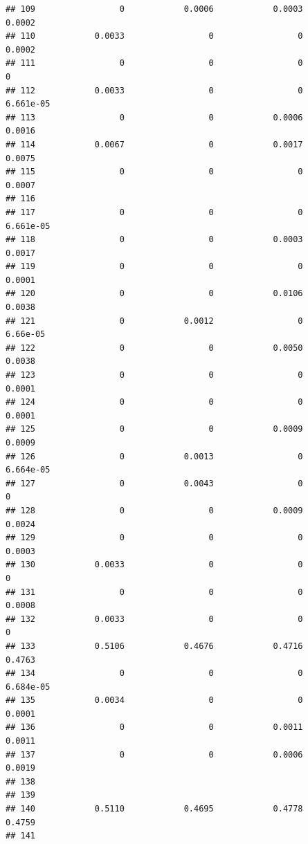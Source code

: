 \documentclass[
]{article}
\begin{document}
\begin{verbatim}
## 109                 0            0.0006            0.0003            0.0002
## 110            0.0033                 0                 0            0.0002
## 111                 0                 0                 0                 0
## 112            0.0033                 0                 0         6.661e-05
## 113                 0                 0            0.0006            0.0016
## 114            0.0067                 0            0.0017            0.0075
## 115                 0                 0                 0            0.0007
## 116                                                                        
## 117                 0                 0                 0         6.661e-05
## 118                 0                 0            0.0003            0.0017
## 119                 0                 0                 0            0.0001
## 120                 0                 0            0.0106            0.0038
## 121                 0            0.0012                 0          6.66e-05
## 122                 0                 0            0.0050            0.0038
## 123                 0                 0                 0            0.0001
## 124                 0                 0                 0            0.0001
## 125                 0                 0            0.0009            0.0009
## 126                 0            0.0013                 0         6.664e-05
## 127                 0            0.0043                 0                 0
## 128                 0                 0            0.0009            0.0024
## 129                 0                 0                 0            0.0003
## 130            0.0033                 0                 0                 0
## 131                 0                 0                 0            0.0008
## 132            0.0033                 0                 0                 0
## 133            0.5106            0.4676            0.4716            0.4763
## 134                 0                 0                 0         6.684e-05
## 135            0.0034                 0                 0            0.0001
## 136                 0                 0            0.0011            0.0011
## 137                 0                 0            0.0006            0.0019
## 138                                                                        
## 139                                                                        
## 140            0.5110            0.4695            0.4778            0.4759
## 141                                                                        

\end{verbatim}
\end{document}
